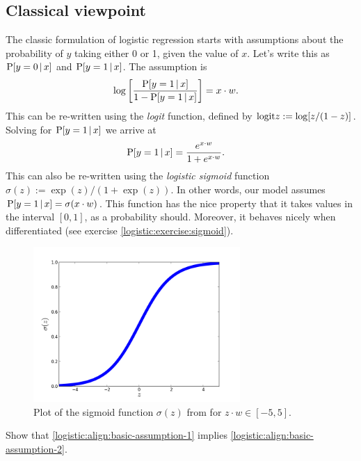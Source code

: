 \subsection{Classical viewpoint}
The classic formulation of logistic regression starts with assumptions about the probability of $y$ taking either 0 or 1, given the value of $x$.  Let's write this as $\mathrm{P}[y=0{\,|\,} x]$ and $\mathrm{P}[y=1{\,|\,} x]$.  The assumption is
\begin{align}
  \log\left[ \frac{\mathrm{P}[y = 1{\,|\,} x]}{1 - \mathrm{P}[y=1{\,|\,} x]} \right] &=x \cdot w.
  \label{logistic:align:basic-assumption-1}
\end{align}
This can be re-written using the \emph{logit} function, defined by ${\mbox{logit}} z := \log[z / (1-z)]$.  Solving for $\mathrm{P}[y=1{\,|\,} x]$ we arrive at
\begin{align}
  \mathrm{P}[y=1{\,|\,} x] &= \frac{e^{x\cdot w}}{1 + e^{x\cdot w}}.
  \label{logistic:align:basic-assumption-2}
\end{align}
This can also be re-written using the \emph{logistic sigmoid} function $\sigma(z) := \exp(z)/(1 + \exp(z))$.  In other words, our model assumes $\mathrm{P}[y=1{\,|\,} x] = \sigma(x\cdot w)$.  This function has the nice property that it takes values in the interval $[0,1]$, as a probability should.  Moreover, it behaves nicely when differentiated (see exercise \ref{logistic:exercise:sigmoid}).
\begin{figure}
  \includegraphics[width=0.7\textwidth]{../images/sigmoid}
  \caption{Plot of the sigmoid function $\sigma(z)$ from for $z\cdot w\in[-5, 5]$.}
\end{figure}

\begin{exercise}
  Show that \eqref{logistic:align:basic-assumption-1} implies \eqref{logistic:align:basic-assumption-2}.
\end{exercise}

